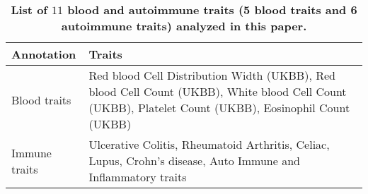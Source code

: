 \newpage
\begin{table}[h]
\centering
\caption{\bf{List of $11$ blood and autoimmune traits (5 blood traits and 6 autoimmune traits) analyzed in this paper.}}
\label{tab:list_blood_traits}
\begin{tabular}[c]{|p{2cm}|p{4cm}|}
\toprule
  Annotation & Traits\\ \hline
Blood traits & Red blood Cell Distribution Width (UKBB\cite{Bycroft2018}), Red blood Cell Count (UKBB\cite{Bycroft2018}), White blood Cell Count (UKBB\cite{Bycroft2018}), Platelet Count (UKBB\cite{Bycroft2018}), Eosinophil Count (UKBB\cite{Bycroft2018}) \\ \hline
Immune traits & Ulcerative Colitis\cite{jostins2012}, Rheumatoid Arthritis\cite{okada2014}, Celiac\cite{Dubois2010}, Lupus\cite{Bentham2015}, Crohn's disease\cite{jostins2012}, Auto Immune and Inflammatory traits  \\ \hline 
\end{tabular}
\end{table}


